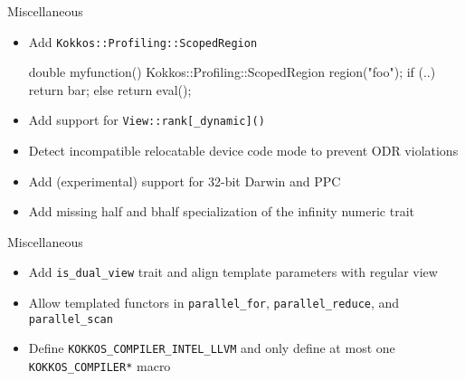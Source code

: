 
\begin{frame}[fragile]{Miscellaneous}
\begin{itemize}
  \item Add \texttt{Kokkos::Profiling::ScopedRegion}
    \begin{code}	
     double myfunction()
     {
      Kokkos::Profiling::ScopedRegion region("foo");
      if (..)
        return bar;
      else
        return eval();
     }
    \end{code}
  \item Add support for \texttt{View::rank[\_dynamic]()}
  \item Detect incompatible relocatable device code mode to prevent ODR violations
  \item Add (experimental) support for 32-bit Darwin and PPC
  \item Add missing half and bhalf specialization of the infinity numeric trait
\end{itemize}
\end{frame}

\begin{frame}[fragile]{Miscellaneous}
\begin{itemize}
  \item Add \texttt{is\_dual\_view} trait and align template parameters with regular view
  \item Allow templated functors in \texttt{parallel\_for},
  \texttt{parallel\_reduce}, and \texttt{parallel\_scan}
  \item Define \texttt{KOKKOS\_COMPILER\_INTEL\_LLVM} and only define at most one
  \texttt{KOKKOS\_COMPILER*} macro
\end{itemize}
\end{frame}
